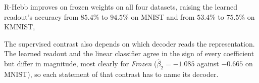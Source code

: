 R-Hebb improves on frozen weights on all four datasets, raising the learned readout's
accuracy from $85.4\%$ to $94.5\%$ on MNIST and from $53.4\%$ to $75.5\%$ on KMNIST,

The supervised contrast also depends on which decoder reads the representation. The learned
readout and the linear classifier agree in the sign of every coefficient but differ in
magnitude, most clearly for \textit{Frozen} ($\hat{\beta}_2 = -1.085$ against $-0.665$ on
MNIST), so each statement of that contrast has to name its decoder.

 \\
